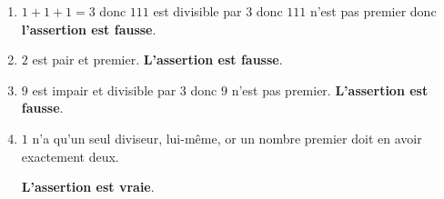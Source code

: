     \begin{enumerate}
        \item $1+1+1 = 3$ donc $111$ est divisible par $3$ donc $111$ n'est pas premier donc \textbf{l'assertion est fausse}.
        \item $2$ est pair et premier. \textbf{L'assertion est fausse}.
        \item $9$ est impair et divisible par $3$ donc $9$ n'est pas premier. \textbf{L'assertion est fausse}.
        \item $1$ n'a qu'un seul diviseur, lui-même, or un nombre premier doit en avoir exactement deux.

        \textbf{L'assertion est vraie}.
    \end{enumerate}
